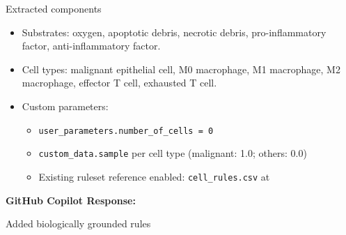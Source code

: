 Extracted components

\begin{itemize}
\tightlist
\item
  Substrates: oxygen, apoptotic debris, necrotic debris,
  pro-inflammatory factor, anti-inflammatory factor.
\item
  Cell types: malignant epithelial cell, M0 macrophage, M1 macrophage,
  M2 macrophage, effector T cell, exhausted T cell.
\item
  Custom parameters:

  \begin{itemize}
  \tightlist
  \item
    \texttt{user\_parameters.number\_of\_cells\ =\ 0}
  \item
    \texttt{custom\_data.sample} per cell type (malignant: 1.0; others:
    0.0)
  \item
    Existing ruleset reference enabled: \texttt{cell\_rules.csv} at
  \end{itemize}
\end{itemize}

\textbf{GitHub Copilot Response:}

Added biologically grounded rules

